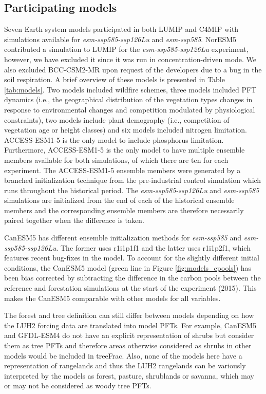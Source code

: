 \documentclass[draft]{agujournal2019}
\begin{document}
\subsection{Participating models}

Seven Earth system models participated in both LUMIP and C4MIP with simulations available for \textit{esm-ssp585-ssp126Lu} and \textit{esm-ssp585}.
NorESM5 contributed a simulation to LUMIP for the \textit{esm-ssp585-ssp126Lu} experiment, however, we have excluded it since it was run in concentration-driven mode.
We also excluded BCC-CSM2-MR upon request of the developers due to a bug in the soil respiration.
A brief overview of these models is presented in Table \ref{tab:models}.
Two models included wildfire schemes, three models included PFT dynamics (i.e., the geographical distribution of the vegetation types changes in response to environmental changes and competition modulated by physiological constraints), two models include plant demography (i.e., competition of vegetation age or height classes) and six models included nitrogen limitation.
ACCESS-ESM1-5 is the only model to include phosphorus limitation.
Furthermore, ACCESS-ESM1-5 is the only model to have multiple ensemble members available for both simulations, of which there are ten for each experiment.
The ACCESS-ESM1-5 ensemble members were generated by a branched initialization technique from the pre-industrial control simulation which runs throughout the historical period.
The \textit{esm-ssp585-ssp126Lu} and \textit{esm-ssp585} simulations are initialized from the end of each of the historical ensemble members and the corresponding ensemble members are therefore necessarily paired together when the difference is taken.

CanESM5 has different ensemble initialization methods for \textit{esm-ssp585} and \textit{esm-ssp585-ssp126Lu}.
The former uses r1i1p1f1 and the latter uses r1i1p2f1, which features recent bug-fixes in the model.
To account for the slightly different initial conditions, the CanESM5 model (green line in Figure \ref{fig:models_cpools}) has been bias corrected by subtracting the difference in the carbon pools between the reference and forestation simulations at the start of the experiment (2015).
This makes the CanESM5 comparable with other models for all variables.

The forest and tree definition can still differ between models depending on how the LUH2 forcing data are translated into model PFTs.
For example, CanESM5 and GFDL-ESM4 do not have an explicit representation of shrubs but consider them as tree PFTs and therefore areas otherwise considered as shrubs in other models would be included in treeFrac.
Also, none of the models here have a representation of rangelands and thus the LUH2 rangelands can be variously interpreted by the models as forest, pasture, shrublands or savanna, which may or may not be considered as woody tree PFTs.
\end{document}
